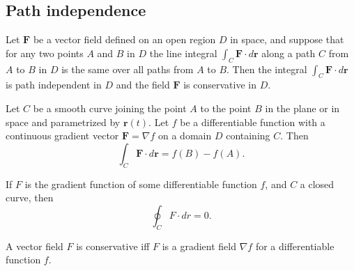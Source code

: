 \documentclass{article}
\begin{document}
\subsection{Path independence}
\begin{definition}
	Let \(\textbf{F}\) be a vector field defined on an open region \(D\) in space, and suppose that for any two points \(A\) and \(B\) in \(D\) the line integral \(\int_C \textbf{F}\cdot d\textbf{r}\) along a path \(C\) from \(A\) to \(B\) in \(D\) is the same over all paths from \(A\) to \(B\). Then the integral \(\int_C\textbf{F}\cdot d\textbf{r}\) is path independent in \(D\) and the field \(\textbf{F}\) is conservative in \(D\).
\end{definition}
\begin{theorem}
	Let \(C\) be a smooth curve joining the point \(A\) to the point \(B\) in the plane or in space and parametrized by \(\textbf{r}(t)\). Let \(f\) be a differentiable function with a continuous gradient vector \(\textbf{F}=\nabla f\) on a domain \(D\) containing \(C\). Then
	\begin{equation*}
		\int_C\textbf{F}\cdot d\textbf{r}=f(B)-f(A).
	\end{equation*}
\end{theorem}
\begin{corollary}
	If \(F\) is the gradient function of some differentiable function \(f\), and \(C\) a closed curve, then
	\begin{equation*}
		\oint_C F\cdot dr=0.
	\end{equation*}
\end{corollary}
\begin{theorem}
	A vector field \(F\) is conservative iff \(F\) is a gradient field \(\nabla f\) for a differentiable function \(f\).
\end{theorem}
\end{document}
